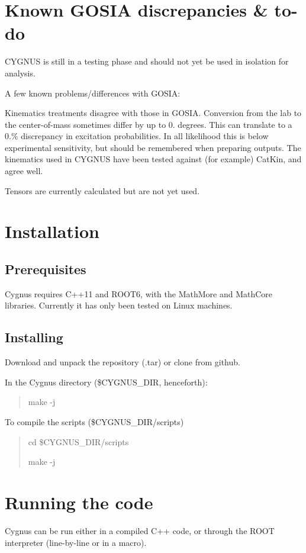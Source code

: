 \hypertarget{index_discrepancies}{}\section{Known G\-O\-S\-I\-A discrepancies \& to-\/do}\label{index_discrepancies}
C\-Y\-G\-N\-U\-S is still in a testing phase and should not yet be used in isolation for analysis.

A few known problems/differences with G\-O\-S\-I\-A\-:

Kinematics treatments disagree with those in G\-O\-S\-I\-A. Conversion from the lab to the center-\/of-\/mass sometimes differ by up to 0. degrees. This can translate to a 0.\% discrepancy in excitation probabilities. In all likelihood this is below experimental sensitivity, but should be remembered when preparing outputs. The kinematics used in C\-Y\-G\-N\-U\-S have been tested against (for example) Cat\-Kin, and agree well.

Tensors are currently calculated but are not yet used.\hypertarget{index_install_sec}{}\section{Installation}\label{index_install_sec}
\hypertarget{index_prereq}{}\subsection{Prerequisites}\label{index_prereq}
Cygnus requires C++11 and R\-O\-O\-T6, with the Math\-More and Math\-Core libraries. Currently it has only been tested on Linux machines.\hypertarget{index_inst}{}\subsection{Installing}\label{index_inst}
Download and unpack the repository (.tar) or clone from github.

In the Cygnus directory (\$\-C\-Y\-G\-N\-U\-S\-\_\-\-D\-I\-R, henceforth)\-: \par
\begin{quotation}
make -\/j

\end{quotation}


To compile the scripts (\$\-C\-Y\-G\-N\-U\-S\-\_\-\-D\-I\-R/scripts) \begin{quotation}
cd \$\-C\-Y\-G\-N\-U\-S\-\_\-\-D\-I\-R/scripts \par
make -\/j

\end{quotation}
\hypertarget{index_running}{}\section{Running the code}\label{index_running}
Cygnus can be run either in a compiled C++ code, or through the R\-O\-O\-T interpreter (line-\/by-\/line or in a macro).


